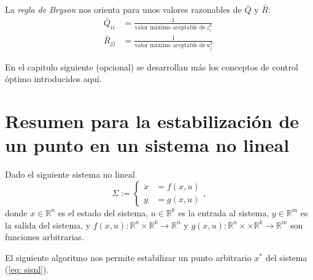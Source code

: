 La \emph{regla de Bryson} nos orienta para unos valores razonables de $\bar Q$ y $\bar R$:
\begin{align}
	\bar Q_{ii} &= \frac{1}{\text{valor máximo aceptable de}\, z_i^2} \nonumber \\
	\bar R_{jj} &= \frac{1}{\text{valor máximo aceptable de}\, u_j^2}. \nonumber
\end{align}

En el capitulo siguiente (opcional) se desarrollan más los conceptos de control óptimo introducidos aquí.


\section{Resumen para la estabilización de un punto en un sistema no lineal}
Dado el siguiente sistema no lineal
\begin{equation}
	\Sigma :=
\begin{cases}
	\dot x &= f(x,u) \\
	y &= g(x,u)
\end{cases}, \label{eq: sisnl}
\end{equation}
donde $x\in\mathbb{R}^n$ es el estado del sistema, $u\in\mathbb{R}^k$ es la entrada al sistema, $y\in\mathbb{R}^m$ es la salida del sistema, y $f(x,u): \mathbb{R}^n\times\mathbb{R}^k \to \mathbb{R}^n$ y  $g(x,u): \mathbb{R}^n\times \times\mathbb{R}^k \to \mathbb{R}^m$ son funciones arbitrarias.

El siguiente algoritmo nos permite estabilizar un punto arbitrario $x^*$ del sistema (\ref{eq: sisnl}).

